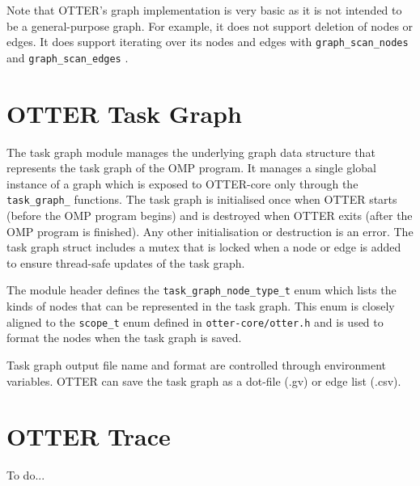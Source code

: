 \documentclass[11pt,a4paper]{article}
\newcommand{\code}[1]{\texttt{#1} }
\begin{document}
Note that OTTER's graph implementation is very basic as it is not intended to be a general-purpose graph. For example, it does not support deletion of nodes or edges. It does support iterating over its nodes and edges with \code{graph\_scan\_nodes} and \code{graph\_scan\_edges}.

\section{OTTER Task Graph}

The task graph module manages the underlying graph data structure that represents the task graph of the OMP program. It manages a single global instance of a graph which is exposed to OTTER-core only through the \code{task\_graph\_} functions. The task graph is initialised once when OTTER starts (before the OMP program begins) and is destroyed when OTTER exits (after the OMP program is finished). Any other initialisation or destruction is an error. The task graph struct includes a mutex that is locked when a node or edge is added to ensure thread-safe updates of the task graph.

The module header defines the \code{task\_graph\_node\_type\_t} enum which lists the kinds of nodes that can be represented in the task graph. This enum is closely aligned to the \code{scope\_t} enum defined in \code{otter-core/otter.h} and is used to format the nodes when the task graph is saved.

Task graph output file name and format are controlled through environment variables. OTTER can save the task graph as a dot-file (.gv) or edge list (.csv).

\section{OTTER Trace}

To do...
\end{document}
